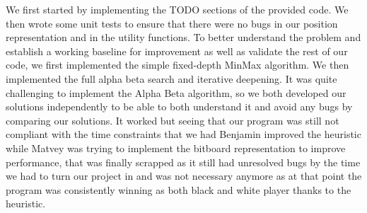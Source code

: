 \documentclass[10pt, titlepage, oneside, a4paper]{article}
\begin{document}
We first started by implementing the TODO sections of the provided code. We then wrote some unit tests to ensure that there were no bugs in our position representation and in the utility functions. To better understand the problem and establish a working baseline for improvement as well as validate the rest of our code, we first implemented the simple fixed-depth MinMax algorithm. We then implemented the full alpha beta search and iterative deepening. It was quite challenging to implement the Alpha Beta algorithm, so we both developed our solutions independently to be able to both understand it and avoid any bugs by comparing our solutions. It worked but seeing that our program was still not compliant with the time constraints that we had Benjamin improved the heuristic while Matvey was trying to implement the bitboard representation to improve performance, that was finally scrapped as it still had unresolved bugs by the time we had to turn our project in and was not necessary anymore as at that point the program was consistently winning as both black and white player thanks to the heuristic.   

\printbibliography
\end{document}
